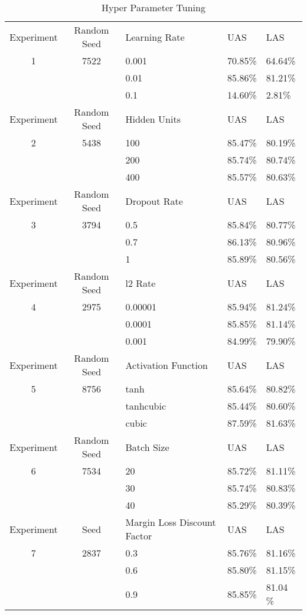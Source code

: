 \begin{table}
\centering
    \begin{tabular}{@{}c c|l l l@{}} \toprule
    Experiment&Random Seed&Learning Rate & UAS & LAS \\  
    1&7522&0.001&70.85\%&64.64\% \\  
    &&0.01&85.86\% &81.21\% \\
    &&0.1&14.60\% &2.81\% \\  \midrule
    Experiment&Random Seed&Hidden Units & UAS & LAS \\  
    2&5438 &100&85.47\% &80.19\% \\  
    &&200&85.74\% &80.74\% \\
    &&400&85.57\% &80.63\% \\  \midrule
    Experiment&Random Seed&Dropout Rate& UAS & LAS \\  
    3&3794&0.5&85.84\% & 80.77\%\\  
    &&0.7&86.13\% & 80.96\%\\
    &&1 &85.89\% &80.56\% \\  \midrule
    Experiment&Random Seed&l2 Rate& UAS & LAS \\  
    4&2975&0.00001&85.94\% &81.24\% \\  
    &&0.0001&85.85\% &81.14\% \\
    &&0.001&84.99\% &79.90\% \\  \midrule
    Experiment&Random Seed&Activation Function& UAS & LAS \\  
    5&8756&tanh&85.64\%&80.82\% \\  
    &&tanhcubic&85.44\% &80.60\% \\
    &&cubic&87.59\% &81.63\% \\ \midrule
    Experiment&Random Seed&Batch Size& UAS & LAS \\  
    6&7534&20&85.72\%&81.11\% \\  
    &&30&85.74\%&80.83\% \\
    &&40&85.29\% &80.39\% \\  \midrule
    Experiment&Seed& Margin Loss Discount Factor& UAS & LAS \\  
    7&2837& 0.3& 85.76\%& 81.16\%\\  
    && 0.6& 85.80\%& 81.15\%\\
    && 0.9& 85.85\%& 81.04 \%\\  
    \bottomrule
    \end{tabular}  
\caption{Hyper Parameter Tuning}\label{tab:tune}
\end{table}

